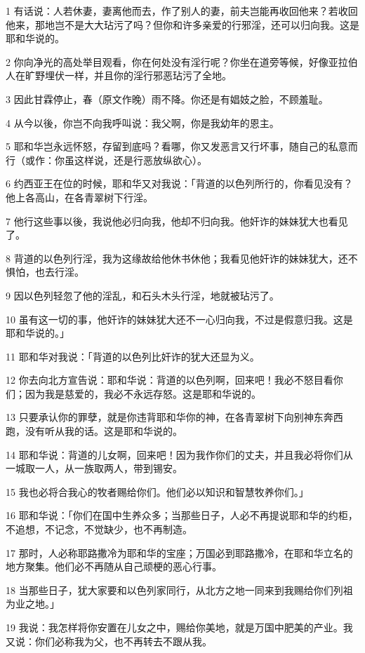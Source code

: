 \par 1 有话说：人若休妻，妻离他而去，作了别人的妻，前夫岂能再收回他来？若收回他来，那地岂不是大大玷污了吗？但你和许多亲爱的行邪淫，还可以归向我。这是耶和华说的。
\par 2 你向净光的高处举目观看，你在何处没有淫行呢？你坐在道旁等候，好像亚拉伯人在旷野埋伏一样，并且你的淫行邪恶玷污了全地。
\par 3 因此甘霖停止，春（原文作晚）雨不降。你还是有娼妓之脸，不顾羞耻。
\par 4 从今以後，你岂不向我呼叫说：我父啊，你是我幼年的恩主。
\par 5 耶和华岂永远怀怒，存留到底吗？看哪，你又发恶言又行坏事，随自己的私意而行（或作：你虽这样说，还是行恶放纵欲心）。
\par 6 约西亚王在位的时候，耶和华又对我说：「背道的以色列所行的，你看见没有？他上各高山，在各青翠树下行淫。
\par 7 他行这些事以後，我说他必归向我，他却不归向我。他奸诈的妹妹犹大也看见了。
\par 8 背道的以色列行淫，我为这缘故给他休书休他；我看见他奸诈的妹妹犹大，还不惧怕，也去行淫。
\par 9 因以色列轻忽了他的淫乱，和石头木头行淫，地就被玷污了。
\par 10 虽有这一切的事，他奸诈的妹妹犹大还不一心归向我，不过是假意归我。这是耶和华说的。」
\par 11 耶和华对我说：「背道的以色列比奸诈的犹大还显为义。
\par 12 你去向北方宣告说：耶和华说：背道的以色列啊，回来吧！我必不怒目看你们；因为我是慈爱的，我必不永远存怒。这是耶和华说的。
\par 13 只要承认你的罪孽，就是你违背耶和华你的神，在各青翠树下向别神东奔西跑，没有听从我的话。这是耶和华说的。
\par 14 耶和华说：背道的儿女啊，回来吧！因为我作你们的丈夫，并且我必将你们从一城取一人，从一族取两人，带到锡安。
\par 15 我也必将合我心的牧者赐给你们。他们必以知识和智慧牧养你们。」
\par 16 耶和华说：「你们在国中生养众多；当那些日子，人必不再提说耶和华的约柜，不追想，不记念，不觉缺少，也不再制造。
\par 17 那时，人必称耶路撒冷为耶和华的宝座；万国必到耶路撒冷，在耶和华立名的地方聚集。他们必不再随从自己顽梗的恶心行事。
\par 18 当那些日子，犹大家要和以色列家同行，从北方之地一同来到我赐给你们列祖为业之地。」
\par 19 我说：我怎样将你安置在儿女之中，赐给你美地，就是万国中肥美的产业。我又说：你们必称我为父，也不再转去不跟从我。

